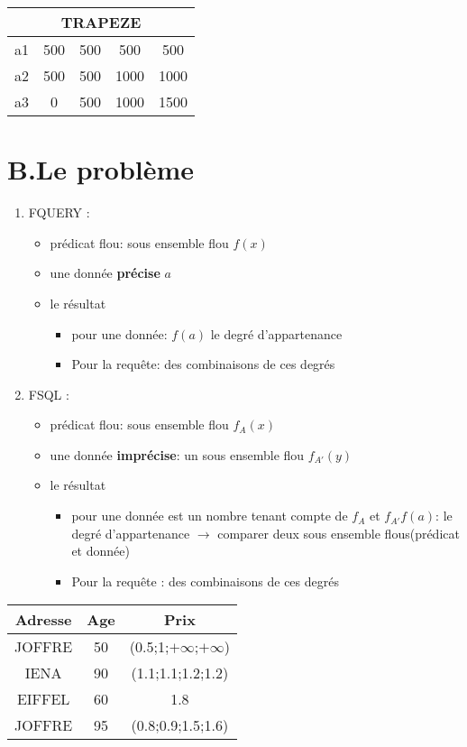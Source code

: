 \documentclass[10pt,a4paper]{report}
\begin{document}
\begin{tabular}{|c|c|c|c|c|}
\hline
\multicolumn{5}{|c|}{TRAPEZE}\\
\hline 
a1 & 500 & 500 & 500 & 500 \\ 
\hline 
a2 & 500 & 500 & 1000 & 1000 \\ 
\hline 
a3 & 0 & 500 & 1000 & 1500 \\ 
\hline 
\end{tabular} 

\chapter{B.Le problème \\}

\begin{enumerate}
\item FQUERY : \\
	\begin{itemize}
	\item prédicat flou: sous ensemble flou $f(x)$
	\item une donnée \textbf{précise} $a$
	\item le résultat
	\begin{itemize}
		\item pour une donnée: $f(a)$ le degré d’appartenance
		\item Pour la requête: des combinaisons de ces degrés
	\end{itemize}		
\end{itemize}

\item FSQL : \\
	\begin{itemize}
	\item prédicat flou: sous ensemble flou $f_A(x)$
	\item une donnée \textbf{imprécise}: un sous ensemble flou $f_{A'}(y)$
	\item le résultat
	\begin{itemize}
		\item pour une donnée est un nombre tenant compte de $f_A$ et $f_{A'} f(a)$: le degré d'appartenance $\rightarrow$ comparer deux sous ensemble flous(prédicat et donnée) 
		\item Pour la requête : des combinaisons de ces degrés
	\end{itemize}		
\end{itemize}
\end{enumerate}

\begin{tabular}{|c|c|c|}
\hline 
Adresse & Age & Prix \\ 
\hline 
JOFFRE & 50 & (0.5;1;$+\infty$;$+\infty$) \\ 
\hline 
IENA & 90 & (1.1;1.1;1.2;1.2) \\ 
\hline 
EIFFEL & 60 & 1.8 \\ 
\hline 
JOFFRE & 95 & (0.8;0.9;1.5;1.6) \\ 
\hline 
\end{tabular} 
\end{document}
